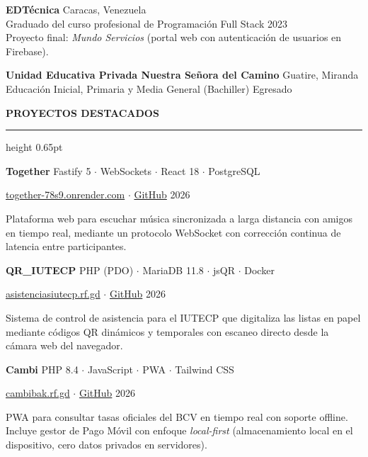 \documentclass[11pt,letterpaper]{article}
\newcommand{\cvsection}[1]{%
  \vspace{4pt}%
  {\color{primarydark}\textbf{\small\bfseries #1}}%
  \par\vspace{1.2pt}%
  {\color{rulebeige}\hrule height 0.65pt}%
  \vspace{2.5pt}%
}
\newcommand{\cvproject}[4]{%
  \textbf{#1} \hfill {\footnotesize\color{textmuted} #2}%
  \par\vspace{0.5pt}%
  {\footnotesize \color{linkbrown}#3} \hfill {\footnotesize\color{textmuted} #4}%
  \par\vspace{0.8pt}%
}
\begin{document}
\vspace{1.5pt}
\textbf{EDTécnica} \hfill {\footnotesize\color{textmuted} Caracas, Venezuela}\\
Graduado del curso profesional de Programación Full Stack \hfill {\footnotesize\color{textmuted} 2023}\\
{\footnotesize\color{textmuted} Proyecto final: \textit{Mundo Servicios} (portal web con autenticación de usuarios en Firebase).}

\vspace{1.5pt}
\textbf{Unidad Educativa Privada Nuestra Señora del Camino} \hfill {\footnotesize\color{textmuted} Guatire, Miranda}\\
Educación Inicial, Primaria y Media General (Bachiller) \hfill {\footnotesize\color{textmuted} Egresado}

\cvsection{PROYECTOS DESTACADOS}

\cvproject{Together}{Fastify 5 $\cdot$ WebSockets $\cdot$ React 18 $\cdot$ PostgreSQL}{\href{https://together-78s9.onrender.com}{together-78s9.onrender.com} \enspace $\cdot$ \enspace \href{https://github.com/fernandorodriguezrada/together}{GitHub}}{2026}
Plataforma web para escuchar música sincronizada a larga distancia con amigos en tiempo real, mediante un protocolo WebSocket con corrección continua de latencia entre participantes.

\vspace{1.5pt}
\cvproject{QR\_IUTECP}{PHP (PDO) $\cdot$ MariaDB 11.8 $\cdot$ jsQR $\cdot$ Docker}{\href{https://asistenciasiutecp.rf.gd/}{asistenciasiutecp.rf.gd} \enspace $\cdot$ \enspace \href{https://github.com/fernandorodriguezrada/qr_iutecp}{GitHub}}{2026}
Sistema de control de asistencia para el IUTECP que digitaliza las listas en papel mediante códigos QR dinámicos y temporales con escaneo directo desde la cámara web del navegador.

\vspace{1.5pt}
\cvproject{Cambi}{PHP 8.4 $\cdot$ JavaScript $\cdot$ PWA $\cdot$ Tailwind CSS}{\href{https://cambibak.rf.gd/}{cambibak.rf.gd} \enspace $\cdot$ \enspace \href{https://github.com/fernandorodriguezrada/cambi}{GitHub}}{2026}
PWA para consultar tasas oficiales del BCV en tiempo real con soporte offline. Incluye gestor de Pago Móvil con enfoque \textit{local-first} (almacenamiento local en el dispositivo, cero datos privados en servidores).
\end{document}
